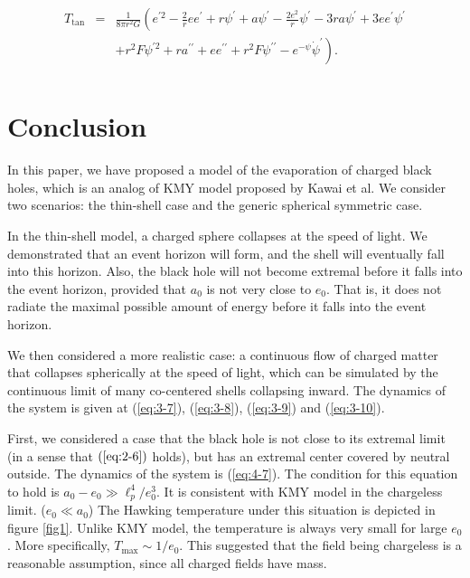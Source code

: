 \documentclass[letterpaper,12pt]{article}
\begin{document}
\begin{eqnarray*}
  T_{\textrm{tan}} &=& \frac{1}{8\pi r^2 G}\left(e^{\prime 2}-\frac{2}{r}ee^{\prime}+r\psi^{\prime}+a\psi^{\prime}-\frac{2e^{2}}{r}\psi^{\prime}-3ra\psi^{\prime}
  +3ee^{\prime}\psi^{\prime}\right.\\
   & &\left.+r^{2}F\psi^{\prime 2}+ra^{\prime\prime}+ee^{\prime\prime}
   +r^{2}F\psi^{\prime\prime}-e^{-\psi}\dot{\psi}^{\prime}\right).\\
\end{eqnarray*}

\section{Conclusion}
In this paper, we have proposed a model of the evaporation of charged black holes, which is an analog of KMY model proposed by Kawai  et al. We consider two scenarios: the thin-shell case and the generic spherical symmetric case.

In the thin-shell model, a charged sphere collapses at the speed of light. We demonstrated that an event horizon will form, and the shell will eventually fall into this horizon. Also, the black hole will not become extremal before it falls into the event horizon, provided that $a_{0}$ is not very close to $e_{0}$. That is, it does not radiate the maximal possible amount of energy before it falls into the event horizon.

We then considered a more realistic case: a continuous flow of charged matter that collapses spherically at the speed of light, which can be simulated by the continuous limit of many co-centered shells collapsing inward. The dynamics of the system is given at (\ref{eq:3-7}), (\ref{eq:3-8}), (\ref{eq:3-9}) and (\ref{eq:3-10}).

First, we considered a case that the black hole is not close to its extremal limit (in a sense that $(\ref{eq:2-6})$ holds), but has an extremal center covered by neutral outside.
The dynamics of the system is (\ref{eq:4-7}). The condition for this equation to hold is $a_{0} - e_{0} \gg \ell_{p}^{4}/e_{0}^{3}$. It is consistent with KMY model in the chargeless limit. ($e_{0} \ll a_{0}$) The Hawking temperature under this situation is depicted in figure \ref{fig1}. Unlike KMY model, the temperature is always very small for large $e_{0}$. More specifically, $T_{\textrm{max}} \sim 1/e_{0}$. This suggested that the field being chargeless is a reasonable assumption, since all charged fields have mass.  
\end{document}

